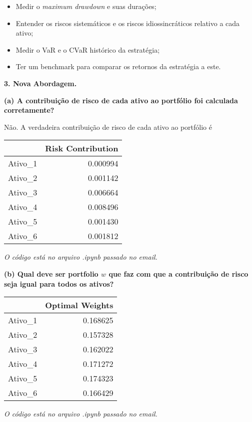 \documentclass[12pt]{article}
\begin{document}
\begin{itemize}
	\item Medir o \textit{maximum drawdown} e suas durações;
	\item Entender os riscos sistemáticos e os riscos idiossincráticos relativo a cada ativo;
	\item Medir o VaR e o CVaR histórico da estratégia;
	\item Ter um benchmark para comparar os retornos da estratégia a este.
\end{itemize}


\textbf{3. Nova Abordagem.}

\textbf{(a) A contribuição de risco de cada ativo ao portfólio foi calculada corretamente?}

Não. A verdadeira contribuição de risco de cada ativo ao portfólio é 

\begin{center}
\begin{tabular}{ c r }
	      & Risk Contribution\\ 
 \hline
 Ativo\_1 & 0.000994\\
 Ativo\_2 & 0.001142\\ 
 Ativo\_3 & 0.006664\\ 
 Ativo\_4 & 0.008496\\  
 Ativo\_5 & 0.001430\\ 
 Ativo\_6 & 0.001812    
\end{tabular}
\end{center}

\textit{O código está no arquivo .ipynb passado no email.}

\textbf{(b) Qual deve ser portfolio $w$ que faz com que a contribuição de risco seja igual para todos os ativos?}

\begin{center}
\begin{tabular}{ c r }
	      & Optimal Weights\\ 
 \hline
 Ativo\_1 & 0.168625\\
 Ativo\_2 & 0.157328\\ 
 Ativo\_3 & 0.162022\\ 
 Ativo\_4 & 0.171272\\  
 Ativo\_5 & 0.174323\\ 
 Ativo\_6 & 0.166429    
\end{tabular}
\end{center}

\textit{O código está no arquivo .ipynb passado no email.}
\end{document}
